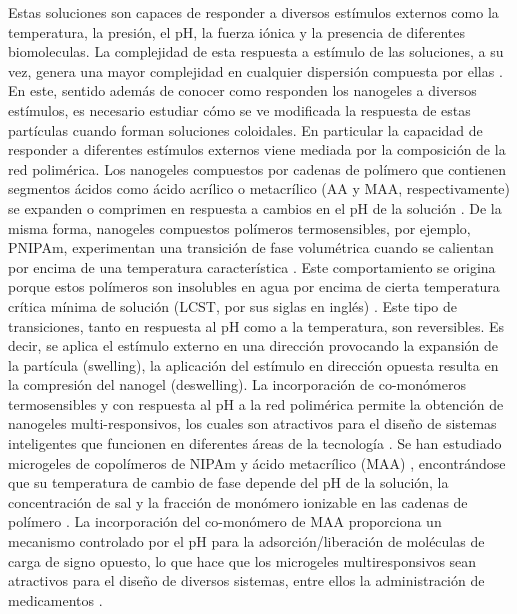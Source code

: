 	Estas soluciones son capaces de responder a diversos est\'imulos externos como la temperatura, la presi\'on, el pH, la fuerza i\'onica y la presencia de diferentes biomoleculas.
	La complejidad de esta respuesta a est\'imulo de las soluciones, a su vez, genera una mayor complejidad en cualquier dispersi\'on compuesta por ellas \cite{lyon2012polymer}.
	En este, sentido adem\'as de conocer como responden los nanogeles a diversos est\'imulos, es necesario estudiar c\'omo se ve modificada la respuesta de estas part\'iculas cuando forman soluciones coloidales. 
	En particular la  capacidad de responder a diferentes est\'imulos externos viene mediada por la composici\'on de la red polim\'erica. Los nanogeles compuestos por cadenas de pol\'imero que contienen segmentos \'acidos como \'acido acr\'ilico o metacr\'ilico (AA y MAA, respectivamente) se expanden o comprimen en respuesta a cambios en el pH de la soluci\'on \cite{snowden1996colloidal, Zhou1998}. De la misma forma, nanogeles compuestos pol\'imeros termosensibles, por ejemplo, PNIPAm, experimentan una transici\'on de fase volum\'etrica cuando se calientan por encima de una temperatura caracter\'istica \cite{Pelton1986, Pelton2000}. Este comportamiento se origina porque estos pol\'imeros son insolubles en agua por encima de cierta temperatura cr\'itica m\'inima de soluci\'on (LCST, por sus siglas en ingl\'es) \cite{Kawaguchi2020}.
	Este tipo de  transiciones, tanto en respuesta al pH como a la temperatura, son reversibles. Es decir, se aplica el est\'imulo externo en una direcci\'on provocando la expansi\'on de la part\'icula (swelling), la aplicaci\'on del est\'imulo en direcci\'on opuesta resulta en la compresi\'on del nanogel (deswelling).
	La incorporaci\'on de co-mon\'omeros termosensibles y con respuesta al pH a la red polim\'erica permite la obtenci\'on de nanogeles multi-responsivos, los cuales son atractivos para el dise\~no de sistemas inteligentes que funcionen en diferentes \'areas de la tecnolog\'ia \cite{plamper2017functional}. Se han estudiado microgeles de copol\'imeros de NIPAm y \'acido metacr\'ilico (MAA) \cite{Dowding2000, Hoare2004, Giussi2015}, encontr\'andose que su temperatura de cambio de fase depende del pH de la soluci\'on, la concentraci\'on de sal y la fracci\'on de mon\'omero ionizable en las cadenas de pol\'imero \cite{Morris1997, Jones2000, Hoare2004, Bradley2005, Lee2008, Wong2009, Hamzavi2016}. La incorporaci\'on del co-mon\'omero de MAA proporciona un mecanismo controlado por el pH para la adsorci\'on/liberaci\'on de mol\'eculas de carga de signo opuesto, lo que hace que los microgeles multiresponsivos sean atractivos para el dise\~no de diversos sistemas, entre ellos la administraci\'on de medicamentos \cite{Liu2017}.
